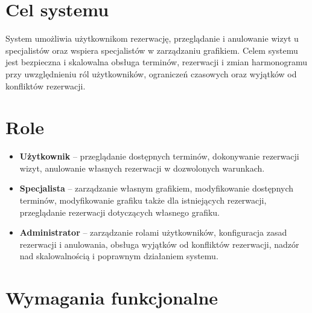 \documentclass[12pt,a4paper]{article}
\begin{document}
\section{Cel systemu}

System umożliwia użytkownikom rezerwację, przeglądanie i anulowanie wizyt u specjalistów oraz wspiera specjalistów w zarządzaniu grafikiem. Celem systemu jest bezpieczna i skalowalna obsługa terminów, rezerwacji i zmian harmonogramu przy uwzględnieniu ról użytkowników, ograniczeń czasowych oraz wyjątków od konfliktów rezerwacji.

\section{Role}

\begin{itemize}[leftmargin=1.5em]
  \item \textbf{Użytkownik} -- przeglądanie dostępnych terminów, dokonywanie rezerwacji wizyt, anulowanie własnych rezerwacji w dozwolonych warunkach.
  \item \textbf{Specjalista} -- zarządzanie własnym grafikiem, modyfikowanie dostępnych terminów, modyfikowanie grafiku także dla istniejących rezerwacji, przeglądanie rezerwacji dotyczących własnego grafiku.
  \item \textbf{Administrator} -- zarządzanie rolami użytkowników, konfiguracja zasad rezerwacji i anulowania, obsługa wyjątków od konfliktów rezerwacji, nadzór nad skalowalnością i poprawnym działaniem systemu.
\end{itemize}

\section{Wymagania funkcjonalne}
\end{document}
